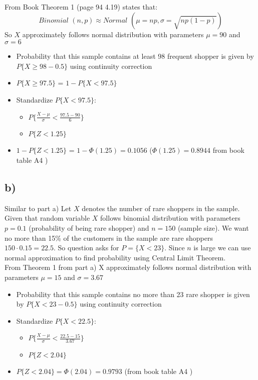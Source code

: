 \documentclass[12pt]{article}
\begin{document}
From Book Theorem 1 (page 94 4.19) states that:
$$\textit{Binomial }(n,p) \approx \textit{Normal }(\mu = np, \sigma = \sqrt{np(1-p)})$$
So $X$ approximately follows normal distribution with parameters $\mu = 90$ and $\sigma = 6$ 
\begin{itemize}
    \item Probability that this sample contains at least 98 frequent shopper is given by $P\{X\geq98-0.5\}$ using continuity correction
    \item $P\{X\geq97.5\}$ = $1-P\{X < 97.5\}$
    \item Standardize $P\{X < 97.5\}$:
    \begin{itemize}
        \item $P\{\frac{X- \mu}{\sigma} < \frac{97.5-90}{6}\}$
        \item $P\{Z < 1.25\}$
    \end{itemize}
    \item $1- P\{Z < 1.25\}$ = $1-\Phi(1.25) = 0.1056$ ($\Phi(1.25) = 0.8944$ from book table A4 )
    
\end{itemize}


\subsection*{b)}
Similar to part a) Let $X$ denotes the number of rare shoppers in the sample. Given that random variable $X$ follows binomial distribution with parameters $p=0.1$ (probability of being rare shopper) and $n=150$ (sample size). We want no more than 15\% of the customers in the sample are rare shoppers $150\cdot0.15 = 22.5$. So question asks for $P= \{X < 23\}$. Since $n$ is large we can use normal approximation to find probability using Central Limit Theorem. \\

From Theorem 1 from part a) X approximately follows normal distribution with parameters $\mu = 15$ and $\sigma = 3.67$
\begin{itemize}
    \item Probability that this sample contains no more than 23 rare shopper is given by $P\{X < 23-0.5\}$ using continuity correction 
    \item Standardize $P \{X < 22.5\}$:
    \begin{itemize}
        \item $P \{\frac{X - \mu}{\sigma}< \frac{22.5 - 15}{3.67}\}$
        \item $P\{Z < 2.04\}$
    \end{itemize}
    \item $P\{Z < 2.04\} = \Phi(2.04) = 0.9793$ (from book table A4 )
\end{itemize}
\end{document}

